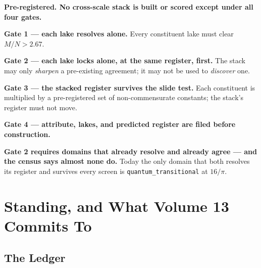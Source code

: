 \documentclass[11pt, letterpaper, openany]{book}
\newcommand{\MN}{M/N}
\begin{document}
\begin{predictionbox}
\textbf{Pre-registered. No cross-scale stack is built or scored except under all four gates.}

\medskip
\textbf{Gate 1 --- each lake resolves alone.} Every constituent lake must clear
$\MN > 2.67$.

\medskip
\textbf{Gate 2 --- each lake locks alone, at the same register, first.} The stack may only
\emph{sharpen} a pre-existing agreement; it may not be used to \emph{discover} one. 

\medskip
\textbf{Gate 3 --- the stacked register survives the slide test.} Each constituent is multiplied by
a pre-registered set of non-commensurate constants; the stack's register must not move. 

\medskip
\textbf{Gate 4 --- attribute, lakes, and predicted register are filed before construction.} 
\end{predictionbox}

\begin{warningbox}
\textbf{Gate 2 requires domains that already resolve and already agree --- and the census says almost none do.} Today the only domain that both resolves its register and survives
every screen is \texttt{quantum\_transitional} at $16/\pi$. 
\end{warningbox}

\chapter{Standing, and What Volume 13 Commits To}

\section{The Ledger}
\end{document}
